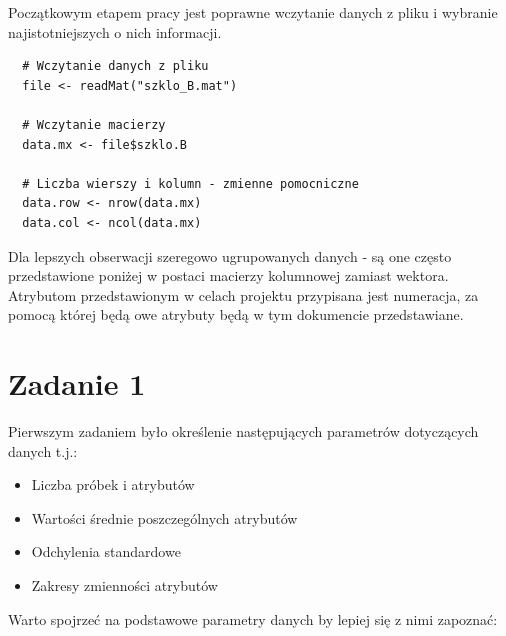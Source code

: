 \documentclass[a4paper,12pt,twoside]{article}
\begin{document}
Początkowym etapem pracy jest poprawne wczytanie danych z pliku i wybranie najistotniejszych
o nich informacji.

\medskip
\begin{lstlisting}
  # Wczytanie danych z pliku
  file <- readMat("szklo_B.mat")

  # Wczytanie macierzy
  data.mx <- file$szklo.B

  # Liczba wierszy i kolumn - zmienne pomocniczne
  data.row <- nrow(data.mx)
  data.col <- ncol(data.mx)
\end{lstlisting}
\medskip

Dla lepszych obserwacji szeregowo ugrupowanych danych - są one często przedstawione
poniżej w postaci macierzy kolumnowej zamiast wektora.\\

Atrybutom przedstawionym w celach projektu przypisana jest numeracja, za pomocą której
będą owe atrybuty będą w tym dokumencie przedstawiane.

\section{Zadanie 1}
\bigskip

Pierwszym zadaniem było określenie następujących  parametrów dotyczących danych t.j.:

\begin{itemize}
\item Liczba próbek i atrybutów
\item Wartości średnie poszczególnych atrybutów
\item Odchylenia standardowe
\item Zakresy zmienności atrybutów
\end{itemize}

Warto spojrzeć na podstawowe parametry danych by lepiej się z nimi zapoznać:
\end{document}
